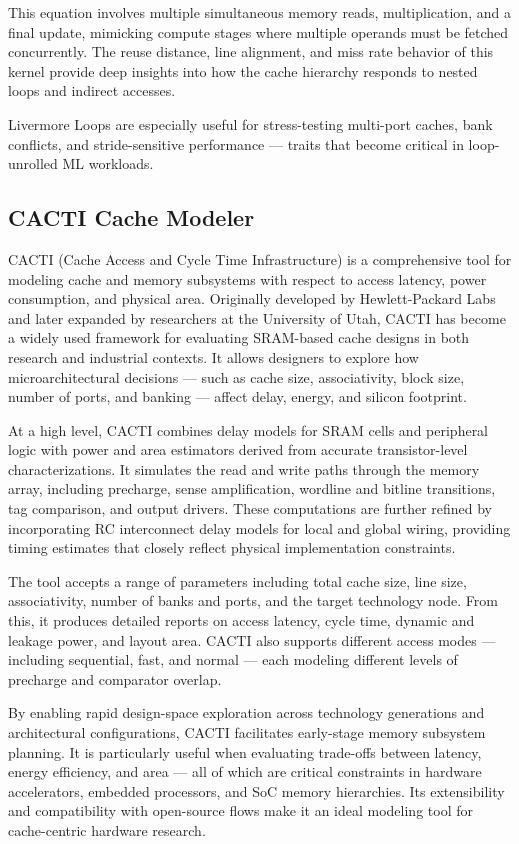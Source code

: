 This equation involves multiple simultaneous memory reads, multiplication, and a final update, mimicking compute stages where multiple operands must be fetched concurrently. The reuse distance, line alignment, and miss rate behavior of this kernel provide deep insights into how the cache hierarchy responds to nested loops and indirect accesses.

Livermore Loops are especially useful for stress-testing multi-port caches, bank conflicts, and stride-sensitive performance — traits that become critical in loop-unrolled ML workloads\cite{cache-6}.

\subsection{CACTI Cache Modeler}
CACTI (Cache Access and Cycle Time Infrastructure) is a comprehensive tool for modeling cache and memory subsystems with respect to access latency, power consumption, and physical area. Originally developed by Hewlett-Packard Labs and later expanded by researchers at the University of Utah, CACTI has become a widely used framework for evaluating SRAM-based cache designs in both research and industrial contexts. It allows designers to explore how microarchitectural decisions — such as cache size, associativity, block size, number of ports, and banking — affect delay, energy, and silicon footprint\cite{cache-7}\cite{cache-8}.

At a high level, CACTI combines delay models for SRAM cells and peripheral logic with power and area estimators derived from accurate transistor-level characterizations. It simulates the read and write paths through the memory array, including precharge, sense amplification, wordline and bitline transitions, tag comparison, and output drivers. These computations are further refined by incorporating RC interconnect delay models for local and global wiring, providing timing estimates that closely reflect physical implementation constraints.

The tool accepts a range of parameters including total cache size, line size, associativity, number of banks and ports, and the target technology node. From this, it produces detailed reports on access latency, cycle time, dynamic and leakage power, and layout area. CACTI also supports different access modes — including sequential, fast, and normal — each modeling different levels of precharge and comparator overlap.

By enabling rapid design-space exploration across technology generations and architectural configurations, CACTI facilitates early-stage memory subsystem planning. It is particularly useful when evaluating trade-offs between latency, energy efficiency, and area — all of which are critical constraints in hardware accelerators, embedded processors, and SoC memory hierarchies. Its extensibility and compatibility with open-source flows make it an ideal modeling tool for cache-centric hardware research.

